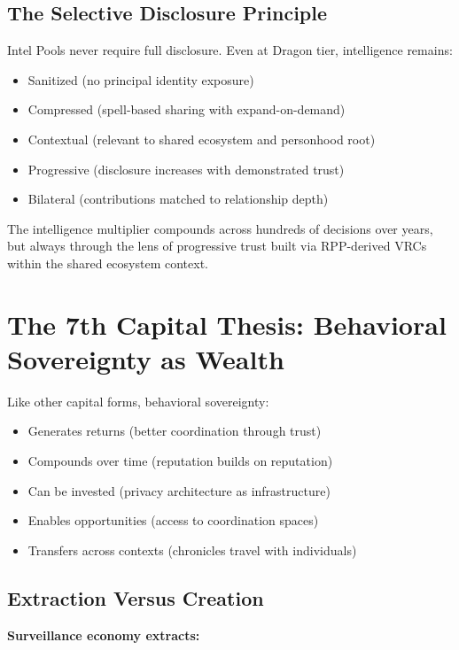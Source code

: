 \documentclass[11pt,a4paper]{article}
\theoremstyle{definition}
\begin{document}
\subsection{The Selective Disclosure Principle}

Intel Pools never require full disclosure. Even at Dragon tier, intelligence remains:

\begin{itemize}
    \item Sanitized (no principal identity exposure)
    \item Compressed (spell-based sharing with expand-on-demand)
    \item Contextual (relevant to shared ecosystem and personhood root)
    \item Progressive (disclosure increases with demonstrated trust)
    \item Bilateral (contributions matched to relationship depth)
\end{itemize}

The intelligence multiplier compounds across hundreds of decisions over years, but always through the lens of progressive trust built via RPP-derived VRCs within the shared ecosystem context.

\section{The 7th Capital Thesis: Behavioral Sovereignty as Wealth}

Like other capital forms, behavioral sovereignty:

\begin{itemize}
    \item Generates returns (better coordination through trust)
    \item Compounds over time (reputation builds on reputation)
    \item Can be invested (privacy architecture as infrastructure)
    \item Enables opportunities (access to coordination spaces)
    \item Transfers across contexts (chronicles travel with individuals)
\end{itemize}

\subsection{Extraction Versus Creation}

\textbf{Surveillance economy extracts:}
\end{document}
